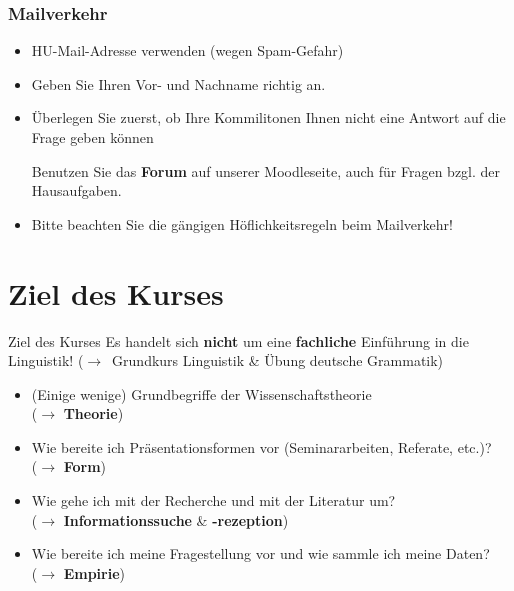 \begin{frame}
\frametitle{Mailverkehr}

\begin{itemize}
	\item HU-Mail-Adresse verwenden (wegen Spam-Gefahr)
	
	\item Geben Sie Ihren Vor- und Nachname richtig an.
	
	\item Überlegen Sie zuerst, ob Ihre Kommilitonen Ihnen nicht eine Antwort auf die Frage geben können
	
	\ras Benutzen Sie das \textbf{Forum} auf unserer Moodleseite, auch für Fragen bzgl. der Hausaufgaben.
	
	\item Bitte beachten Sie die gängigen Höflichkeitsregeln beim Mailverkehr!
\end{itemize}

\end{frame}


\section{Ziel des Kurses}

\begin{frame}{Ziel des Kurses}
Es handelt sich \textbf{nicht} um eine \textbf{fachliche} Einführung in die Linguistik! ($\rightarrow$~Grundkurs Linguistik \& Übung deutsche Grammatik)

\begin{itemize}
	\item<2-> (Einige wenige) Grundbegriffe der Wissenschaftstheorie\\
	($\rightarrow$ \textbf{Theorie})

	\item<3-> Wie bereite ich Präsentationsformen vor (Seminararbeiten, Referate, etc.)?\\
	($\rightarrow$ \textbf{Form})
	
	\item<4-> Wie gehe ich mit der Recherche und mit der Literatur um?\\
	($\rightarrow$ \textbf{Informationssuche} \&  \textbf{-rezeption})
	
	\item<5-> Wie bereite ich meine Fragestellung vor und wie sammle ich meine Daten?\\
	($\rightarrow$ \textbf{Empirie})
\end{itemize}
\end{frame}


